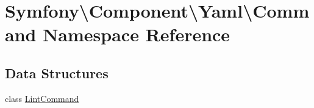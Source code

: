 \hypertarget{namespace_symfony_1_1_component_1_1_yaml_1_1_command}{}\section{Symfony\textbackslash{}Component\textbackslash{}Yaml\textbackslash{}Command Namespace Reference}
\label{namespace_symfony_1_1_component_1_1_yaml_1_1_command}
\subsection*{Data Structures}
\begin{DoxyCompactItemize}
\item 
class \mbox{\hyperlink{class_symfony_1_1_component_1_1_yaml_1_1_command_1_1_lint_command}{Lint\+Command}}
\end{DoxyCompactItemize}
